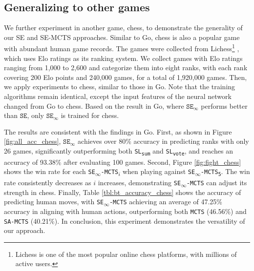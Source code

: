 
%

\subsection{Generalizing to other games}
\label{subsec:generality}

We further experiment in another game, chess, to demonstrate the generality of our SE and SE-MCTS approaches.
Similar to Go, chess is also a popular game with abundant human game records.
The games were collected from Lichess\footnote{Lichess is one of the most popular online chess platforms, with millions of active users.} \citep{lichess_2024}, which uses Elo ratings as its ranking system.
We collect games with Elo ratings ranging from 1,000 to 2,600 and categorize them into eight ranks, with each rank covering 200 Elo points and 240,000 games, for a total of 1,920,000 games.
Then, we apply experiments to chess, similar to those in Go.
Note that the training algorithms remain identical, except the input features of the neural network changed from Go to chess.
Based on the result in Go, where $\texttt{SE}_{\infty}$ performs better than $\texttt{SE}$, only $\texttt{SE}_{\infty}$ is trained for chess.

The results are consistent with the findings in Go.
First, as shown in Figure \ref{fig:all_acc_chess}, $\texttt{SE}_{\infty}$ achieves over 80\% accuracy in predicting ranks with only 26 games, significantly outperforming both \texttt{SL\textsubscript{sum}} and \texttt{SL\textsubscript{vote}}, and reaches an accuracy of 93.38\% after evaluating 100 games.
Second, Figure \ref{fig:fight_chess} shows the win rate for each \texttt{SE\textsubscript{$\infty$}-MCTS\textsubscript{$i$}} when playing against \texttt{SE\textsubscript{$\infty$}-MCTS\textsubscript{5}}.
The win rate consistently decreases as $i$ increases, demonstrating \texttt{SE\textsubscript{$\infty$}-MCTS} can adjust its strength in chess.
Finally, Table \ref{tbl:bt_accuracy_chess} shows the accuracy of predicting human moves, with \texttt{SE\textsubscript{$\infty$}-MCTS} achieving an average of 47.25\% accuracy in aligning with human actions, outperforming both \texttt{MCTS} (46.56\%) and \texttt{SA-MCTS} (40.21\%).
In conclusion, this experiment demonstrates the versatility of our approach.


